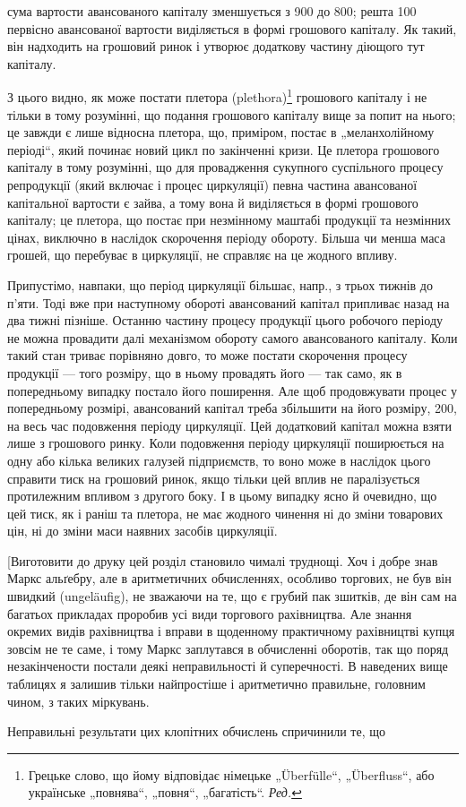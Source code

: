 \parcont{}  %
сума вартости авансованого капіталу зменшується з 900 до
800; решта 100 первісно авансованої вартости виділяється
в формі грошового капіталу. Як такий, він надходить на грошовий
ринок і утворює додаткову частину діющого тут капіталу.

З цього видно, як може постати плетора (plethora)\footnote*{
Грецьке слово, що йому відповідає німецьке „Überfülle“,
„Überfluss“, або українське „повнява“, „повня“, „багатість“. \emph{Ред.}
} грошового капіталу
і не тільки в тому розумінні, що подання грошового капіталу вище
за попит на нього; це завжди є лише відносна плетора, що, приміром,
постає в „меланхолійному періоді“, який починає новий цикл по
закінченні кризи. Це плетора грошового капіталу в тому розумінні, що
для провадження сукупного суспільного процесу репродукції (який включає
і процес циркуляції) певна частина авансованої капітальної вартости
є зайва, а тому вона й виділяється в формі грошового капіталу; це плетора,
що постає при незмінному маштабі продукції та незмінних цінах,
виключно в наслідок скорочення періоду обороту. Більша чи менша маса
грошей, що перебуває в циркуляції, не справляє на це жодного впливу.

Припустімо, навпаки, що період циркуляції більшає, напр., з трьох
тижнів до п’яти. Тоді вже при наступному обороті авансований капітал
припливає назад на два тижні пізніше. Останню частину процесу продукції
цього робочого періоду не можна провадити далі механізмом обороту
самого авансованого капіталу. Коли такий стан триває порівняно довго,
то може постати скорочення процесу продукції — того розміру, що в
ньому провадять його — так само, як в попередньому випадку постало
його поширення. Але щоб продовжувати процес у попередньому розмірі,
авансований капітал треба збільшити на  його розміру, \deq{} 200, на весь час подовження періоду циркуляції. Цей додатковий капітал
можна взяти лише з грошового ринку. Коли подовження періоду
циркуляції поширюється на одну або кілька великих галузей підприємств,
то воно може в наслідок цього справити тиск на грошовий ринок, якщо
тільки цей вплив не паралізується протилежним впливом з другого боку.
І в цьому випадку ясно й очевидно, що цей тиск, як і раніш та плетора,
не має жодного чинення ні до зміни товарових цін, ні до зміни маси
наявних засобів циркуляції.

[Виготовити до друку цей розділ становило чималі труднощі. Хоч і
добре знав Маркс альґебру, але в аритметичних обчисленнях, особливо
торгових, не був він швидкий (ungeläufig), не зважаючи на те, що є грубий
пак зшитків, де він сам на багатьох прикладах проробив усі види торгового
рахівництва. Але знання окремих видів рахівництва і вправи в
щоденному практичному рахівництві купця зовсім не те саме, і тому
Маркс заплутався в обчисленні оборотів, так що поряд незакінчености
постали деякі неправильності й суперечності. В наведених вище таблицях
я залишив тільки найпростіше і аритметично правильне, головним чином,
з таких міркувань.

Неправильні результати цих клопітних обчислень спричинили те, що
\parbreak{}  %
